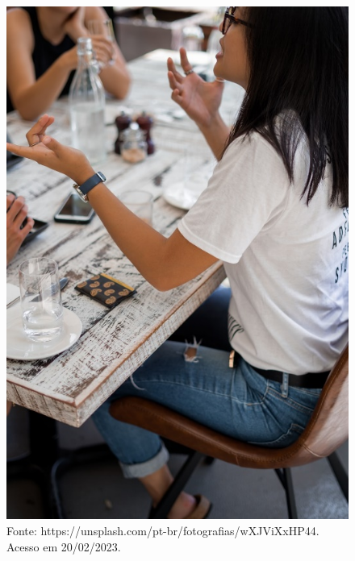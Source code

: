 \begin{figure}[htpb!]
\includegraphics[width=.5\textwidth]{./imgs/img10.jpg}
\caption{Fonte: https://unsplash.com/pt-br/fotografias/wXJViXxHP44. Acesso em 20/02/2023.}
\end{figure}

